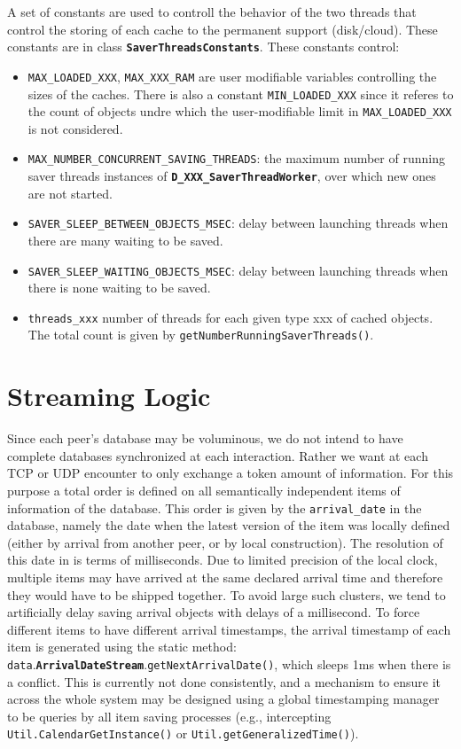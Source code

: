 \documentclass{book}
\newcommand{\pkg}[1]{{\tt #1}}
\newcommand{\cls}[1]{{\tt\bf #1}}
\newcommand{\mth}[1]{{\tt #1}}
\newcommand{\mmb}[1]{{\tt #1}}
\begin{document}
A set of constants are used to controll the behavior of the two threads that control the storing of each cache to the
permanent support (disk/cloud).
These constants are in class \cls{SaverThreadsConstants}. These constants control:
\begin{itemize}
\item
\mmb{MAX\_LOADED\_XXX}, \mmb{MAX\_XXX\_RAM} are user modifiable variables controlling
 the sizes of the caches. There is also a constant  \mmb{MIN\_LOADED\_XXX}
since it referes to the count of objects undre which the user-modifiable limit in \mmb{MAX\_LOADED\_XXX} is not considered.
\item
\mmb{MAX\_NUMBER\_CONCURRENT\_SAVING\_THREADS}:
 the maximum number of running saver threads instances of \cls{D\_XXX\_SaverThreadWorker}, over which new ones are not started.
\item
\mmb{SAVER\_SLEEP\_BETWEEN\_OBJECTS\_MSEC}: delay between launching threads when there are many waiting to be saved.
\item
\mmb{SAVER\_SLEEP\_WAITING\_OBJECTS\_MSEC}: delay between launching threads when there is none waiting to be saved.
\item
\mmb{threads\_xxx} number of threads for each given type xxx of cached objects. The total count is given by \mth{getNumberRunningSaverThreads()}.
\end{itemize}

\chapter{Streaming Logic}

Since each peer's database may be voluminous, we do not intend to have complete databases synchronized
at each interaction.
Rather we want at each TCP or UDP encounter to only exchange a token amount of information. For this purpose
a total order is defined on all semantically independent items of information of the database. This order is given by the
\mmb{arrival\_date} in the database, namely the date when the latest version of the item was locally defined (either by arrival 
from another peer, or by local construction). The resolution of this date in is terms of milliseconds. Due to limited precision
of the local clock, multiple items may have arrived at the same declared arrival time and therefore they would
have to be shipped together. To avoid large such clusters, we tend to artificially delay saving arrival objects with delays of a millisecond.
To force different items to have different arrival timestamps, the arrival timestamp of each item is generated using the
static method: \pkg{data}.\cls{ArrivalDateStream}.\mth{getNextArrivalDate()}, which sleeps 1ms when there is a conflict.
This is currently not done consistently, and a mechanism to ensure it across the whole system may be designed using
a global timestamping manager to be queries by all item saving processes (e.g., intercepting \mth{Util.CalendarGetInstance()} or \mth{Util.getGeneralizedTime()}).
 
\end{document}
